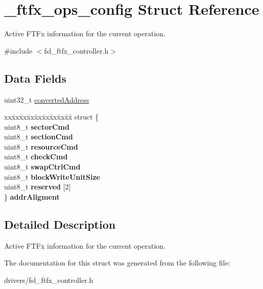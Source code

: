 \hypertarget{struct__ftfx__ops__config}{}\section{\+\_\+ftfx\+\_\+ops\+\_\+config Struct Reference}
\label{struct__ftfx__ops__config}


Active F\+T\+Fx information for the current operation.  




{\ttfamily \#include $<$fsl\+\_\+ftfx\+\_\+controller.\+h$>$}

\subsection*{Data Fields}
\begin{DoxyCompactItemize}
\item 
uint32\+\_\+t \mbox{\hyperlink{group__ftfx__controller_ga103f050a0770fca8ee73b78a283337a1}{converted\+Address}}
\item 
\begin{tabbing}
xx\=xx\=xx\=xx\=xx\=xx\=xx\=xx\=xx\=\kill
struct \{\\
\>uint8\_t {\bfseries sectorCmd}\\
\>uint8\_t {\bfseries sectionCmd}\\
\>uint8\_t {\bfseries resourceCmd}\\
\>uint8\_t {\bfseries checkCmd}\\
\>uint8\_t {\bfseries swapCtrlCmd}\\
\>uint8\_t {\bfseries blockWriteUnitSize}\\
\>uint8\_t {\bfseries reserved} \mbox{[}2\mbox{]}\\
\} {\bfseries addrAligment}\\

\end{tabbing}\end{DoxyCompactItemize}


\subsection{Detailed Description}
Active F\+T\+Fx information for the current operation. 

The documentation for this struct was generated from the following file\+:\begin{DoxyCompactItemize}
\item 
drivers/fsl\+\_\+ftfx\+\_\+controller.\+h\end{DoxyCompactItemize}
